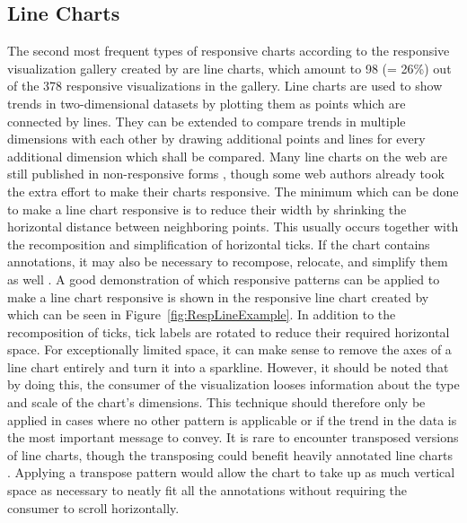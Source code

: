 

\subsection{Line Charts}

The second most frequent types of responsive charts according to the
responsive visualization gallery created by
\textcite{DesignPatternsTradeOffsRespVis} are line charts, which
amount to 98 (= 26\%) out of the 378 responsive visualizations in the
gallery.  Line charts are used to show trends in two-dimensional
datasets by plotting them as points which are connected by lines.
They can be extended to compare trends in multiple dimensions with
each other by drawing additional points and lines for every additional
dimension which shall be compared.  Many line charts on the web are
still published in non-responsive forms \parencite{HLine,HLine2},
though some web authors already took the extra effort to make their
charts responsive.  The minimum which can be done to make a line chart
responsive is to reduce their width \parencite{RespRadialScatterHLine}
by shrinking the horizontal distance between neighboring points.  This
usually occurs together with the recomposition and simplification of
horizontal ticks.  If the chart contains annotations, it may also be
necessary to recompose, relocate, and simplify them as well
\parencite{RespHLines,RespHLine,RespHBarHLine,RespHLineHStackedBar}.
A good demonstration of which responsive patterns can be applied to
make a line chart responsive is shown in the responsive line chart
created by \textcite{RespVis} which can be seen in
Figure~\ref{fig:RespLineExample}.  In addition to the recomposition of
ticks, tick labels are rotated to reduce their required horizontal
space.  For exceptionally limited space, it can make sense to remove
the axes of a line chart entirely and turn it into a sparkline.
However, it should be noted that by doing this, the consumer of the
visualization looses information about the type and scale of the
chart's dimensions.  This technique should therefore only be applied
in cases where no other pattern is applicable or if the trend in the
data is the most important message to convey.  It is rare to encounter
transposed versions of line charts, though the transposing could
benefit heavily annotated line charts \parencite{VLine}.  Applying a
transpose pattern would allow the chart to take up as much vertical
space as necessary to neatly fit all the annotations without requiring
the consumer to scroll horizontally.



